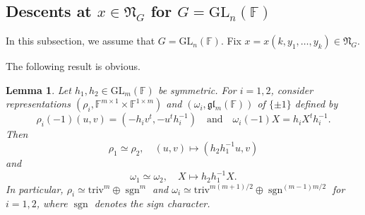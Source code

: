 \documentclass[12pt]{amsart}
\newtheorem{lm}{Lemma}[section]
\theoremstyle{definition}
\theoremstyle{remark}\newtheorem{rmk}[lm]{Remark}
\newcommand{\GL}{{\mathrm{GL}}}
\newcommand{\triv}{\mathrm{triv}}
\newcommand{\sgn}{\operatorname{sgn}}
\newcommand{\gl}{\mathfrak g \mathfrak l}
\newcommand{\fN}{\mathfrak N}
\newcommand{\C}{\mathbb{F}}
\begin{document}
	\subsection{Descents at $x\in\fN_{G}$ for $G=\GL_n(\C)$}
    In this subsection, we assume that $G=\GL_n(\C)$. Fix $x=x(k,y_1,\dots,y_k)\in\fN_{G}$.
    
    The following result is obvious.
    
    \begin{lm}
    	\label{lm:descentgln}
    	Let $h_1,h_2\in\GL_m(\C)$ be symmetric. For $i=1,2$, consider representations $(\rho_i,\C^{m\times 1}\times\C^{1\times m})$ and $(\omega_i,\gl_m(\C))$ of $\{\pm 1\}$ defined by
    	\begin{equation*}
    		\rho_i(-1)(u,v)=(-h_iv^t,-u^th_i^{-1})\quad\text{and}\quad\omega_i(-1)X=h_iX^th_i^{-1}.
    	\end{equation*}
    	Then
    	\begin{equation*}
    		\rho_1\simeq\rho_2,\quad (u,v)\mapsto(h_2h_1^{-1}u,v)
    	\end{equation*}
    	and
    	\begin{equation*}
    		\omega_1\simeq\omega_2,\quad X\mapsto h_2h_1^{-1}X.
    	\end{equation*}
    	In particular, $\rho_i\simeq\triv^m\oplus\sgn^m$ and $\omega_i\simeq\triv^{m(m+1)/2}\oplus\sgn^{(m-1)m/2}$ for $i=1,2$, where $\sgn$ denotes the sign character.
    \end{lm}
    
\end{document}
